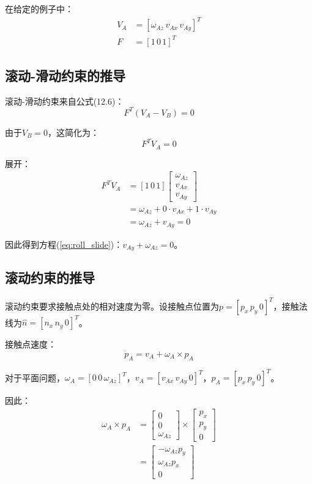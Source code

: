 \documentclass[12pt,a4paper]{article}
\begin{document}
在给定的例子中：
\begin{align}
V_A &= [\omega_{Az} \, v_{Ax} \, v_{Ay}]^T \\
F &= [1 \, 0 \, 1]^T
\end{align}

\subsection{滚动-滑动约束的推导}

滚动-滑动约束来自公式(12.6)：
\begin{equation}
F^T (V_A - V_B) = 0
\end{equation}

由于$V_B = 0$，这简化为：
\begin{equation}
F^T V_A = 0
\end{equation}

展开：
\begin{align}
F^T V_A &= [1 \, 0 \, 1] \begin{bmatrix} \omega_{Az} \\ v_{Ax} \\ v_{Ay} \end{bmatrix} \\
&= \omega_{Az} + 0 \cdot v_{Ax} + 1 \cdot v_{Ay} \\
&= \omega_{Az} + v_{Ay} = 0
\end{align}

因此得到方程(\ref{eq:roll_slide})：$v_{Ay} + \omega_{Az} = 0$。

\subsection{滚动约束的推导}

滚动约束要求接触点处的相对速度为零。设接触点位置为$p = [p_x \, p_y \, 0]^T$，接触法线为$\hat{n} = [n_x \, n_y \, 0]^T$。

接触点速度：
\begin{equation}
\dot{p}_A = v_A + \omega_A \times p_A
\end{equation}

对于平面问题，$\omega_A = [0 \, 0 \, \omega_{Az}]^T$，$v_A = [v_{Ax} \, v_{Ay} \, 0]^T$，$p_A = [p_x \, p_y \, 0]^T$。

因此：
\begin{align}
\omega_A \times p_A &= \begin{bmatrix} 0 \\ 0 \\ \omega_{Az} \end{bmatrix} \times \begin{bmatrix} p_x \\ p_y \\ 0 \end{bmatrix} \\
&= \begin{bmatrix} -\omega_{Az} p_y \\ \omega_{Az} p_x \\ 0 \end{bmatrix}
\end{align}
\end{document}
